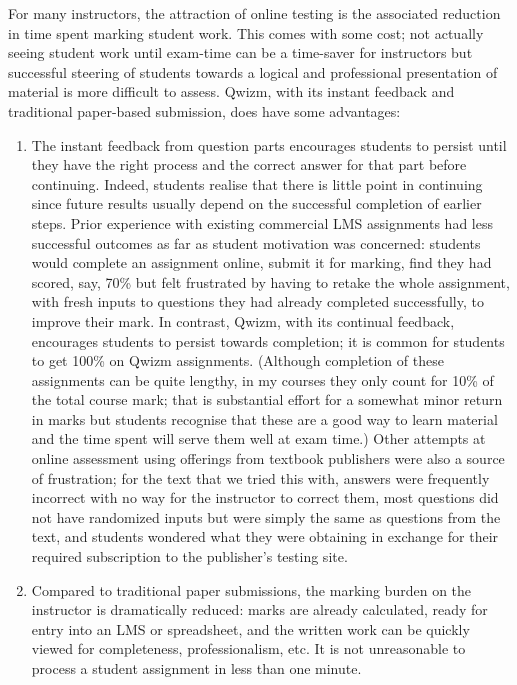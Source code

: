 \documentclass{tufte-handout}
\begin{document}
For many instructors, the attraction of online testing is the associated reduction in time spent marking student work. This comes with some cost; not actually seeing student work until exam-time can be a time-saver for instructors but successful steering of students towards a logical and professional presentation of material is more difficult to assess.
\parm
Qwizm, with its instant feedback and traditional paper-based submission, does have some advantages:
\begin{enumerate}
	\item The instant feedback from question parts encourages students to persist until they have the right process and the correct answer for that part before continuing. Indeed, students realise that there is little point in continuing since future results usually depend on the successful completion of earlier steps.
	\parm
Prior experience with existing commercial LMS assignments had less successful outcomes as far as student motivation was concerned: students would complete an assignment online, submit it for marking, find they had scored, say, 70\% but felt frustrated by having to retake the whole assignment, with fresh inputs to questions they had already completed successfully, to improve their mark. In contrast, Qwizm, with its continual feedback, encourages students to persist towards completion; it is common for students to get 100\% on Qwizm assignments.
\parm
(Although completion of these assignments can be quite lengthy, in my courses they only count for 10\% of the total course mark; that is substantial effort for a somewhat minor return in marks but students recognise that these are a good way to learn material and the time spent will serve them well at exam time.)
\parm
Other attempts at online assessment using offerings from textbook publishers were also a source of frustration; for the text that we tried this with, answers were frequently incorrect with no way for the instructor to correct them, most questions did not have randomized inputs but were simply the same as questions from the text, and students wondered what they were obtaining in exchange for their required subscription to the publisher's testing site.
	\item Compared to traditional paper submissions, the marking burden on the instructor is dramatically reduced: marks are already calculated, ready for entry into an LMS or spreadsheet, and the written work can be quickly viewed for completeness, professionalism, etc. It is not unreasonable to process a student assignment in less than one minute.
\end{enumerate}



%
% 
% 
\end{document}
